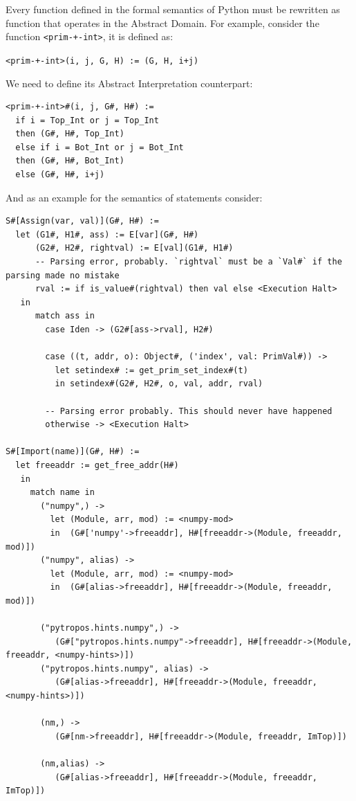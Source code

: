 \documentclass[
11pt, %
english, %
singlespacing, %
headsepline, %
]{MastersDoctoralThesis} %
\begin{document}
Every function defined in the formal semantics of Python must be
rewritten as function that operates in the Abstract Domain. For example,
consider the function \texttt{\textless{}prim-+-int\textgreater{}}, it
is defined as:

\texttt{\textless{}prim-+-int\textgreater{}(i,\ j,\ G,\ H)\ :=\ (G,\ H,\ i+j)}

We need to define its Abstract Interpretation counterpart:

\begin{verbatim}
<prim-+-int>#(i, j, G#, H#) :=
  if i = Top_Int or j = Top_Int
  then (G#, H#, Top_Int)
  else if i = Bot_Int or j = Bot_Int
  then (G#, H#, Bot_Int)
  else (G#, H#, i+j)
\end{verbatim}

And as an example for the semantics of statements consider:

\begin{verbatim}
S#[Assign(var, val)](G#, H#) :=
  let (G1#, H1#, ass) := E[var](G#, H#)
      (G2#, H2#, rightval) := E[val](G1#, H1#)
      -- Parsing error, probably. `rightval` must be a `Val#` if the parsing made no mistake
      rval := if is_value#(rightval) then val else <Execution Halt>
   in
      match ass in
        case Iden -> (G2#[ass->rval], H2#)

        case ((t, addr, o): Object#, ('index', val: PrimVal#)) ->
          let setindex# := get_prim_set_index#(t)
          in setindex#(G2#, H2#, o, val, addr, rval)

        -- Parsing error probably. This should never have happened
        otherwise -> <Execution Halt>

S#[Import(name)](G#, H#) :=
  let freeaddr := get_free_addr(H#)
   in
     match name in
       ("numpy",) ->
         let (Module, arr, mod) := <numpy-mod>
         in  (G#['numpy'->freeaddr], H#[freeaddr->(Module, freeaddr, mod)])
       ("numpy", alias) ->
         let (Module, arr, mod) := <numpy-mod>
         in  (G#[alias->freeaddr], H#[freeaddr->(Module, freeaddr, mod)])

       ("pytropos.hints.numpy",) ->
          (G#["pytropos.hints.numpy"->freeaddr], H#[freeaddr->(Module, freeaddr, <numpy-hints>)])
       ("pytropos.hints.numpy", alias) ->
          (G#[alias->freeaddr], H#[freeaddr->(Module, freeaddr, <numpy-hints>)])

       (nm,) ->
          (G#[nm->freeaddr], H#[freeaddr->(Module, freeaddr, ImTop)])

       (nm,alias) ->
          (G#[alias->freeaddr], H#[freeaddr->(Module, freeaddr, ImTop)])
\end{verbatim}
\end{document}
